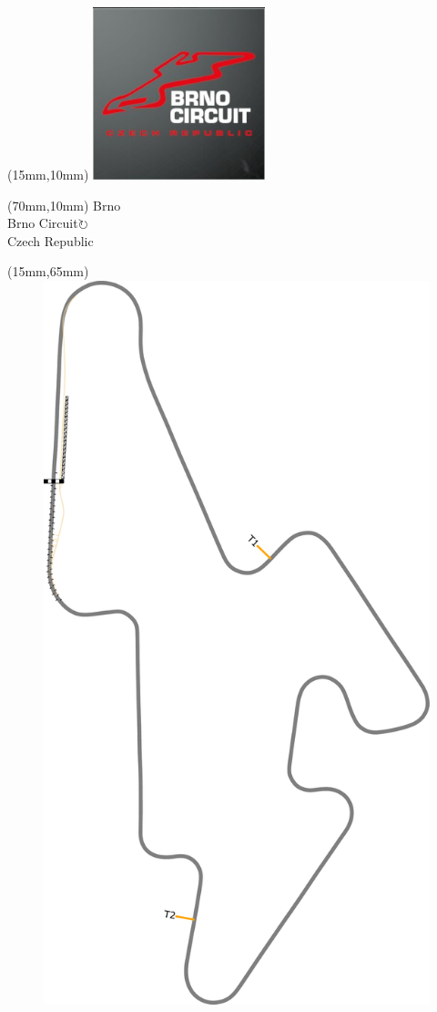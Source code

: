\null\newpage
\begin{textblock*}{50mm}(15mm,10mm)%
\includegraphics[width=50mm]{LG/2015-05-20_00075.png}
\end{textblock*}
\begin{textblock*}{130mm}(70mm,10mm)%
{\fontsize{20}{20}\selectfont Brno\\}
{\fontsize{16}{16}\selectfont Brno Circuit\hfill \Large$\circlearrowright$\\}
{\fontsize{12}{12}\selectfont Czech Republic\\}
\end{textblock*}
\begin{textblock*}{185mm}(15mm,65mm)%
\centering
\mbox{\includegraphics[width=185mm,height=210mm,keepaspectratio]{PT/BRNO.pdf}}
\end{textblock*}
